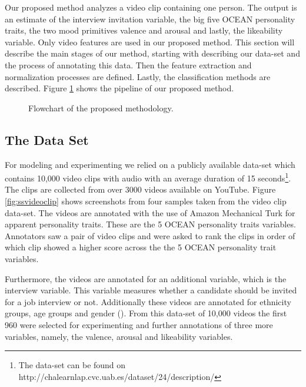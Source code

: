 Our proposed method analyzes a video clip containing one person. The output is an estimate of the interview invitation variable, the big five OCEAN personality traits, the two mood primitives valence and arousal and lastly, the likeability variable. Only video features are used in our proposed method. This section will describe the main stages of our method, starting with describing our data-set and the process of annotating this data. Then the feature extraction and normalization processes are defined. Lastly, the classification methods are described. Figure \ref{fig:proposedmethod} shows the pipeline of our proposed method.

\begin{figure}[h]
  \centering
  
  \caption{Flowchart of the proposed methodology.}
  \label{fig:proposedmethod}
\end{figure}

\subsection{The Data Set}
\label{subsection:dataset}

For modeling and experimenting we relied on a publicly available data-set which contains 10,000 video clips with audio with an average duration of 15 seconds\footnote{The data-set can be found on http://chalearnlap.cvc.uab.es/dataset/24/description/}. The clips are collected from over 3000 videos available on YouTube. Figure \ref{fig:ssvideoclip} shows screenshots from four samples taken from the video clip data-set. The videos are annotated with the use of Amazon Mechanical Turk for apparent personality traits. These are the 5 OCEAN personality traits variables. Annotators saw a pair of video clips and were asked to rank the clips in order of which clip showed a higher score across the the 5 OCEAN personality trait variables. 

Furthermore, the videos are annotated for an additional variable, which is the interview variable. This variable measures whether a candidate should be invited for a job interview or not. Additionally these videos are annotated for ethnicity groups, age groups and gender (\cite{escalante2018explaining}). From this data-set of 10,000 videos the first 960 were selected for experimenting and further annotations of three more variables, namely, the valence, arousal and likeability variables. 


